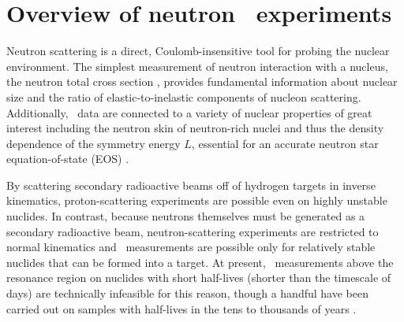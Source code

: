 \section{Overview of neutron \tot\ experiments}

Neutron scattering is a direct, Coulomb-insensitive tool for probing the nuclear
environment. The simplest measurement of neutron interaction with a nucleus,
the neutron total cross section \tot, provides fundamental information about
nuclear size and the ratio of elastic-to-inelastic components of nucleon 
scattering. Additionally, \tot\ data are connected to a variety of nuclear
properties of great interest including the neutron skin of neutron-rich nuclei
\cite{Mahzoon2017} and thus the density dependence of the symmetry energy $L$,
essential for an accurate neutron star equation-of-state (EOS)
\cite{Fattoyev2012, Vinas2014, Brown2000}.

By scattering secondary radioactive beams off of hydrogen targets in \gls{inverse
kinematics}, proton-scattering experiments are possible even on highly unstable
nuclides. In contrast, because neutrons themselves must be generated as a
secondary radioactive beam, neutron-scattering experiments are restricted to
normal kinematics and \tot\ measurements are possible only for relatively stable
nuclides that can be formed into a target. At present, \tot\ measurements above
the resonance region on nuclides with short half-lives (shorter than the timescale of
days) are technically infeasible for this reason, though a handful have been carried out on
samples with half-lives in the tens to thousands of years \cite{Poenitz1983,
Phillips1980, Foster1971}.


